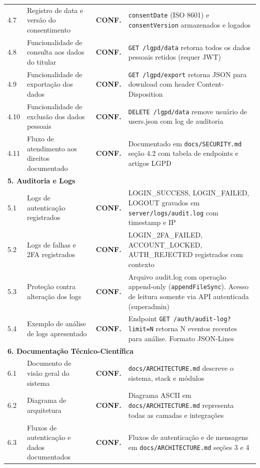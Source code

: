 \documentclass[11pt, a4paper]{article}
\newcommand{\conf}{\textcolor{conf}{\textbf{CONF.}}}
\begin{document}
\begin{longtable}{p{0.8cm}p{5.5cm}cp{8.2cm}}
4.7 & Registro de data e versão do consentimento & \conf & \texttt{consentDate} (ISO 8601) e \texttt{consentVersion} armazenados e logados \\
4.8 & Funcionalidade de consulta aos dados do titular & \conf & \texttt{GET /lgpd/data} retorna todos os dados pessoais retidos (requer JWT) \\
4.9 & Funcionalidade de exportação dos dados & \conf & \texttt{GET /lgpd/export} retorna JSON para download com header Content-Disposition \\
4.10 & Funcionalidade de exclusão dos dados pessoais & \conf & \texttt{DELETE /lgpd/data} remove usuário de users.json com log de auditoria \\
4.11 & Fluxo de atendimento aos direitos documentado & \conf & Documentado em \texttt{docs/SECURITY.md} seção 4.2 com tabela de endpoints e artigos LGPD \\
\midrule
\multicolumn{4}{l}{\textbf{5. Auditoria e Logs}} \\
\midrule
5.1 & Logs de autenticação registrados & \conf & LOGIN\_SUCCESS, LOGIN\_FAILED, LOGOUT gravados em \texttt{server/logs/audit.log} com timestamp e IP \\
5.2 & Logs de falhas e 2FA registrados & \conf & LOGIN\_2FA\_FAILED, ACCOUNT\_LOCKED, AUTH\_REJECTED registrados com contexto \\
5.3 & Proteção contra alteração dos logs & \conf & Arquivo audit.log com operação append-only (\texttt{appendFileSync}). Acesso de leitura somente via API autenticada (superadmin) \\
5.4 & Exemplo de análise de logs apresentado & \conf & Endpoint \texttt{GET /auth/audit-log?limit=N} retorna N eventos recentes para análise. Formato JSON-Lines \\
\midrule
\multicolumn{4}{l}{\textbf{6. Documentação Técnico-Científica}} \\
\midrule
6.1 & Documento de visão geral do sistema & \conf & \texttt{docs/ARCHITECTURE.md} descreve o sistema, stack e módulos \\
6.2 & Diagrama de arquitetura & \conf & Diagrama ASCII em \texttt{docs/ARCHITECTURE.md} representa todas as camadas e integrações \\
6.3 & Fluxos de autenticação e dados documentados & \conf & Fluxos de autenticação e de mensagens em \texttt{docs/ARCHITECTURE.md} seções 3 e 4 \\

\end{longtable}
\end{document}
